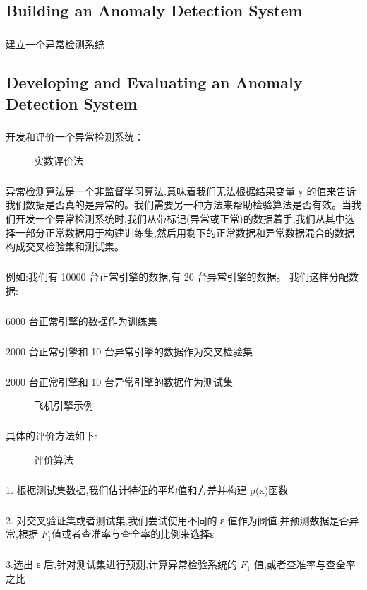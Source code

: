 \documentclass{article}
\begin{document}
\begin{CJK}{UTF8}{gbsn}
\section{Building an Anomaly Detection System}
\subparagraph{}
建立一个异常检测系统
\subsection{Developing and Evaluating an Anomaly Detection System}
\subparagraph{}
开发和评价一个异常检测系统：
\begin{figure}[H]
\caption{实数评价法}
\label{fig:930}
\end{figure}
\subparagraph{}
异常检测算法是一个非监督学习算法,意味着我们无法根据结果变量 y 的值来告诉我们数据是否真的是异常的。我们需要另一种方法来帮助检验算法是否有效。当我们开发一个异常检测系统时,我们从带标记(异常或正常)的数据着手,我们从其中选择一部分正常数据用于构建训练集,然后用剩下的正常数据和异常数据混合的数据构成交叉检验集和测试集。
\subparagraph{}
例如:我们有 10000 台正常引擎的数据,有 20 台异常引擎的数据。 我们这样分配数据:
\subparagraph{}
6000 台正常引擎的数据作为训练集
\subparagraph{}
2000 台正常引擎和 10 台异常引擎的数据作为交叉检验集
\subparagraph{}
2000 台正常引擎和 10 台异常引擎的数据作为测试集
\begin{figure}[H]
\caption{飞机引擎示例}
\label{fig:931}
\end{figure}
\subparagraph{}
具体的评价方法如下:
\begin{figure}[H]
\caption{评价算法}
\label{fig:932}
\end{figure}
\subparagraph{}
1. 根据测试集数据,我们估计特征的平均值和方差并构建 p(x)函数
\subparagraph{}
2. 对交叉验证集或者测试集,我们尝试使用不同的 ε 值作为阀值,并预测数据是否异常,根据 $F_1$值或者查准率与查全率的比例来选择ε
\subparagraph{}
3.选出 ε 后,针对测试集进行预测,计算异常检验系统的 $F_1$ 值,或者查准率与查全率之比
\begin{figure}[H]
\label{fig:919}
\end{figure}

\end{CJK}
\end{document}
